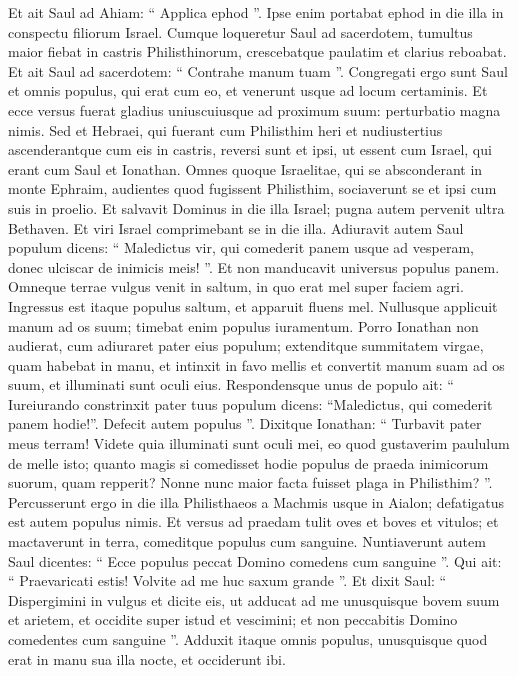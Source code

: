 \begin{biblechapter}
\begin{biblechapter}
\begin{biblechapter}
\begin{biblechapter}
\begin{biblechapter}
\begin{biblechapter}
\begin{biblechapter}
\begin{biblechapter}
\begin{biblechapter}
\begin{biblechapter}
\begin{biblechapter}
\begin{biblechapter}
\begin{biblechapter}
\begin{biblechapter}
\verse Et ait Saul ad Ahiam: “ Applica ephod ”. Ipse enim portabat ephod in die illa in conspectu filiorum Israel. 
\verse Cumque loqueretur Saul ad sacerdotem, tumultus maior fiebat in castris Philisthinorum, crescebatque paulatim et clarius reboabat. Et ait Saul ad sacerdotem: “ Contrahe manum tuam ”.
 \verse Congregati ergo sunt Saul et omnis populus, qui erat cum eo, et venerunt usque ad locum certaminis. Et ecce versus fuerat gladius uniuscuiusque ad proximum suum: perturbatio magna nimis. 
\verse Sed et Hebraei, qui fuerant cum Philisthim heri et nudiustertius ascenderantque cum eis in castris, reversi sunt et ipsi, ut essent cum Israel, qui erant cum Saul et Ionathan. 
\verse Omnes quoque Israelitae, qui se absconderant in monte Ephraim, audientes quod fugissent Philisthim, sociaverunt se et ipsi cum suis in proelio. 
\verse Et salvavit Dominus in die illa Israel; pugna autem pervenit ultra Bethaven.
 \verse Et viri Israel comprimebant se in die illa. Adiuravit autem Saul populum dicens: “ Maledictus vir, qui comederit panem usque ad vesperam, donec ulciscar de inimicis meis! ”. Et non manducavit universus populus panem. 
\verse Omneque terrae vulgus venit in saltum, in quo erat mel super faciem agri. 
\verse Ingressus est itaque populus saltum, et apparuit fluens mel. Nullusque applicuit manum ad os suum; timebat enim populus iuramentum.
 \verse Porro Ionathan non audierat, cum adiuraret pater eius populum; extenditque summitatem virgae, quam habebat in manu, et intinxit in favo mellis et convertit manum suam ad os suum, et illuminati sunt oculi eius. 
\verse Respondensque unus de populo ait: “ Iureiurando constrinxit pater tuus populum dicens: “Maledictus, qui comederit panem hodie!”. Defecit autem populus ”. 
\verse Dixitque Ionathan: “ Turbavit pater meus terram! Videte quia illuminati sunt oculi mei, eo quod gustaverim paululum de melle isto; 
\verse quanto magis si comedisset hodie populus de praeda inimicorum suorum, quam repperit? Nonne nunc maior facta fuisset plaga in Philisthim? ”.
 \verse Percusserunt ergo in die illa Philisthaeos a Machmis usque in Aialon; defatigatus est autem populus nimis. 
\verse Et versus ad praedam tulit oves et boves et vitulos; et mactaverunt in terra, comeditque populus cum sanguine. 
 \verse Nuntiaverunt autem Saul dicentes: “ Ecce populus peccat Domino comedens cum sanguine ”. Qui ait: “ Praevaricati estis! Volvite ad me huc saxum grande ”. 
 \verse Et dixit Saul: “ Dispergimini in vulgus et dicite eis, ut adducat ad me unusquisque bovem suum et arietem, et occidite super istud et vescimini; et non peccabitis Domino comedentes cum sanguine ”. Adduxit itaque omnis populus, unusquisque quod erat in manu sua illa nocte, et occiderunt ibi. 

\end{biblechapter}
\end{biblechapter}
\end{biblechapter}
\end{biblechapter}
\end{biblechapter}
\end{biblechapter}
\end{biblechapter}
\end{biblechapter}
\end{biblechapter}
\end{biblechapter}
\end{biblechapter}
\end{biblechapter}
\end{biblechapter}
\end{biblechapter}

